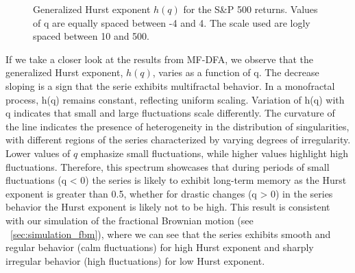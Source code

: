 \documentclass[11pt]{extarticle}
\begin{document}
\begin{figure}[htbp]
    \centering
    \caption{Generalized Hurst exponent $h(q)$ for the S\&P 500 returns. Values of q are equally spaced between -4 and 4.
    The scale used are logly spaced between 10 and 500.}
\end{figure}

\FloatBarrier

If we take a closer look at the results from MF-DFA, we observe that the generalized Hurst exponent, $h(q)$,
varies as a function of q. The decrease sloping is a sign that the serie exhibits multifractal behavior.
In a monofractal process, h(q) remains constant, reflecting uniform scaling.
Variation of h(q) with q indicates that small and large fluctuations scale differently.
The curvature of the line indicates the presence of heterogeneity in the distribution of singularities, with
different regions of the series characterized by varying degrees of irregularity.
Lower values of $q$ emphasize small fluctuations, while higher values highlight high fluctuations.
Therefore, this spectrum showcases that during periods of small fluctuations (q < 0) the series is likely to exhibit long-term
memory as the Hurst exponent is greater than 0.5, whether for drastic changes (q > 0) in the series behavior the Hurst exponent
is likely not to be high.
This result is consistent with our simulation of the fractional Brownian motion (see ~\ref{sec:simulation_fbm}), where we can see that the
series exhibits smooth and regular behavior (calm fluctuations) for high Hurst exponent and sharply irregular behavior
(high fluctuations) for low Hurst exponent. \\
\end{document}
